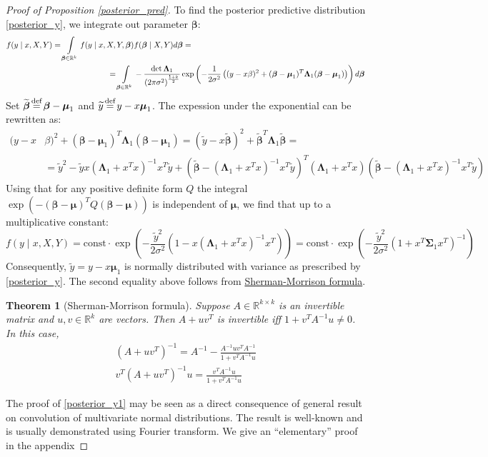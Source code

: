 \documentclass[10pt,fleqn]{amsart}
\newtheorem{theorem}{Theorem}[section]
\theoremstyle{definition}
\theoremstyle{remark}
\numberwithin{equation}{section}
\newcommand{\RR}{\mathbb{R}}
\newcommand{\eq}{\stackrel{\mathclap{\normalfont\text{def}}}{=}}
\newcommand{\const}{\text{const}}
\newcommand{\bbeta}{\boldsymbol{\beta}}
\newcommand{\mmu}{\boldsymbol{\mu}}
\newcommand{\SSigma}{\boldsymbol{\Sigma}}
\newcommand{\LLambda}{\boldsymbol{\Lambda}}
\begin{document}
\begin{proof}[Proof of Proposition \ref{posterior_pred}]
\noindent To find the posterior predictive distribution \ref{posterior_y}, we integrate out parameter $\bbeta$:
\begin{equation*}\begin{split}
f(y\mid x, X, Y)=\int\displaylimits_{\bbeta\in\RR^k}f(y\mid x,X,Y,\bbeta)&f(\bbeta\mid X,Y)d\bbeta=\\
=\int\displaylimits_{\bbeta\in\RR^k}&-\frac {\det \LLambda_1}{\left(2\pi\sigma^2\right)^{\frac{1+k}2}}
\exp\left(-\frac 1{2\sigma^2}\left((y-x\beta)^2+(\bbeta-\mmu_1)^T\LLambda_1(\bbeta-\mmu_1)\right)\right)d\bbeta
\end{split}\end{equation*}
Set $\widetilde{\bbeta}\eq\bbeta-\mmu_1$ and $\widetilde{y}\eq y-x\mmu_1$. The expession under the exponential can be rewritten as:
\begin{equation*}\begin{split}
    (y-x&\beta)^2+(\bbeta-\mmu_1)^T\LLambda_1(\bbeta-\mmu_1)=
    \left(\widetilde{y}-x\widetilde{\bbeta}\right)^2+\widetilde{\bbeta}^T\LLambda_1\widetilde{\bbeta}=\\
    &=\widetilde{y}^2-\widetilde{y}x\left(\LLambda_1+x^Tx\right)^{-1}x^T\widetilde{y}+
    \left(\widetilde{\bbeta}-\left(\LLambda_1+x^Tx\right)^{-1}x^T\widetilde{y}\right)^T\left(\LLambda_1+x^Tx\right)
    \left(\widetilde{\bbeta}-\left(\LLambda_1+x^Tx\right)^{-1}x^T\widetilde{y}\right)
\end{split}\end{equation*}
Using that for any positive definite form $Q$ the integral $\exp(-(\bbeta-\mmu)^TQ(\bbeta - \mmu))$ is independent of $\mmu$,
we find that up to a multiplicative constant:
\begin{equation*}
    f(y\mid x, X, Y)=\const\cdot \exp\left(-\frac {\widetilde{y}^2}{2\sigma^2}\left(1-x\left(\LLambda_1+x^Tx\right)^{-1}x^T\right)\right)=
    \const\cdot \exp\left(-\frac {\widetilde{y}^2}{2\sigma^2}\left(1+x^T\SSigma_1 x^T\right)^{-1}\right)
\end{equation*}
Consequently, $\widetilde{y}=y-x\mmu_1$ is normally distributed with variance as prescribed by \ref{posterior_y}.
The second equality above follows from \href{https://en.wikipedia.org/wiki/Sherman%E2%80%93Morrison_formula}{Sherman-Morrison formula}.
\begin{theorem}[Sherman-Morrison formula]
    Suppose $A\in\RR^{k\times k}$ is an invertible matrix and $u,v\in \RR^k$ are vectors. Then $A+uv^T$  is invertible iff $1+v^TA^{-1}u\neq 0$.
    In this case,
    \begin{align}
        \left(A+uv^T\right)^{-1}=A^{-1}-\frac{A^{-1}uv^TA^{-1}}{1+v^TA^{-1}u}\\
        v^T\left(A+uv^T\right)^{-1}u=\frac{v^TA^{-1}u}{1+v^TA^{-1}u}
    \end{align}
\end{theorem}
The proof of \ref{posterior_y1} may be seen as a direct consequence of general result on convolution of multivariate normal distributions.
The result is well-known and is usually demonstrated using Fourier transform. We give an ``elementary'' proof in the appendix
\end{proof}
\end{document}
